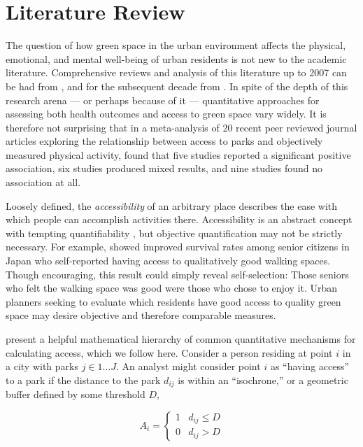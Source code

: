 \documentclass[shortAfour,sageh.bst]{sagej}
\begin{document}
\hypertarget{literature-review}{%
\section{Literature Review}\label{literature-review}}

\label{sec:litreview}

The question of how green space in the urban
environment affects the physical, emotional, and mental well-being of
urban residents is not new to the academic literature. Comprehensive
reviews and analysis of this literature up to 2007 can be had from
\citet{tzoulas2007promoting}, and for the subsequent decade from
\citet{kabisch2015human}. In spite of the depth of this research arena
--- or perhaps because of it --- quantitative approaches for assessing
both health outcomes and access to green space vary widely. It is
therefore not surprising that in a meta-analysis of 20 recent peer
reviewed journal articles exploring the relationship between access to
parks and objectively measured physical activity, \citet{Bancroft2015}
found that five studies reported a significant positive association, six
studies produced mixed results, and nine studies found no association at
all.

Loosely defined, the \emph{accessibility} of an arbitrary place
describes the ease with which people can accomplish activities there.
Accessibility is an abstract concept with tempting quantifiability
\citep{Handy1997}, but objective quantification may not be strictly
necessary. For example, \citet{takano2002urban} showed improved survival
rates among senior citizens in Japan who self-reported having access to
qualitatively good walking spaces. Though encouraging, this result could
simply reveal self-selection: Those seniors who felt the walking space
was good were those who chose to enjoy it. Urban planners seeking to
evaluate which residents have good access to quality green space may
desire objective and therefore comparable measures.

\citet{Dong2006} present a helpful mathematical hierarchy of common
quantitative mechanisms for calculating access, which we follow here.
Consider a person residing at point \(i\) in a city with parks
\(j \in 1 \ldots J\). An analyst might consider point \(i\) as ``having
access'' to a park if the distance to the park \(d_{ij}\) is within an
``isochrone,'' or a geometric buffer defined by some threshold \(D\),

\begin{equation}\label{eq:isochrone}
A_i = \begin{cases}
      1 & d_{ij}\leq D\\
      0 & d_{ij} > D
   \end{cases}
\end{equation}
\end{document}

